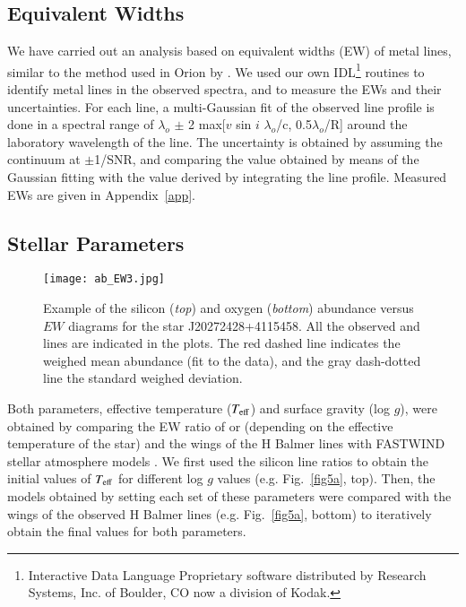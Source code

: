 \documentclass{aa} %
\begin{document}
	\subsection{Equivalent Widths}\label{sect31}
We have carried out an analysis based on equivalent widths (EW) of metal lines, similar to the method used in Orion by \cite{ssimon10}. We used our own IDL\footnote{Interactive Data Language
Proprietary software distributed by Research Systems, Inc. of Boulder, CO now a division of Kodak.} routines to identify metal lines in the observed spectra, and to measure the EWs and their uncertainties. 
For each line, a multi-Gaussian fit of the observed line profile is done in a spectral range  of $\lambda_o$ $\pm$ 2 max[$v$ sin $i$ $\lambda_o$/c, 0.5$\lambda_o$/R] around the laboratory wavelength of the line. The uncertainty is obtained by assuming the continuum at $\pm$1/SNR, and comparing the value obtained by means of the Gaussian fitting with the value derived by integrating the line profile. Measured EWs are given in Appendix~\ref{app}. 


	\subsection{Stellar Parameters}\label{sect32}
	

    \begin{figure}[t!]
\centering
\texttt{[image: ab\_EW3.jpg]}
\caption{ Example of the silicon (\textit{top}) and  oxygen (\textit{bottom}) abundance versus $EW$ diagrams for the star J20272428+4115458. All the observed  and  lines are indicated in the plots. The red dashed line indicates the weighed mean abundance (fit to the data), and the gray dash-dotted line the standard weighed deviation.  
}
\label{fig8}
\end{figure} 

	

 Both parameters, effective temperature ($T_{\rm eff}$) and surface gravity (log $g$), were obtained by comparing the EW ratio of  or  (depending on the effective temperature of the star) and the wings of the H Balmer lines with FASTWIND stellar atmosphere models \citep{santolaya97, puls05}. We first used the silicon line ratios to obtain the initial values of $T_{\rm eff}$ for different log $g$  values (e.g. Fig.~\ref{fig5a}, top). Then, the models obtained by setting each set of these parameters were compared with the wings of the observed H Balmer lines (e.g. Fig.~\ref{fig5a}, bottom) to iteratively obtain the final values for both parameters.
 
\end{document}
